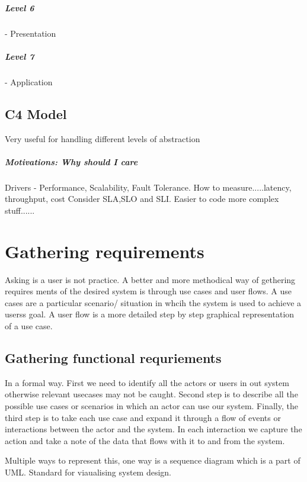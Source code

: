 \documentclass[a4paper, 11pt]{book}
\begin{document}
    \paragraph{Level 6} - Presentation

    \paragraph{Level 7} - Application

    \section{C4 Model}
    Very useful for handling different levels of abstraction

    \paragraph{Motivations: Why should I care}
    Drivers - Performance, Scalability, Fault Tolerance.
    How to measure.....latency, throughput, cost
    Consider SLA,SLO and SLI.
    Easier to code more complex stuff......

    \chapter{Gathering requirements}
    Asking is a user is not practice.
    A better and more methodical way of gethering requires ments of the desired system is through use cases and user flows.
    A use cases are a particular scenario/ situation in whcih the system is used to achieve a userss goal.
    A user flow is a more detailed step by step graphical representation of a use case.

    \section{Gathering functional requriements}
    In a formal way.
    First we need to identify all the actors or users in out system otherwise relevant usecases may not be caught.
    Second step is to describe all the possible use cases or scenarios in which an actor can use our system.
    Finally, the third step is to take each use case and expand it through a flow of events or interactions between the actor and the system.
    In each interaction we capture the action and take a note of the data that flows with it to and from the system.

    Multiple ways to represent this, one way is a sequence diagram which is a part of UML. Standard for viaualising system design.
\end{document}
